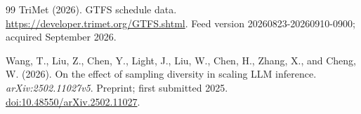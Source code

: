 \documentclass[a4paper,twoside]{article}
\begin{document}
\begin{thebibliography}{99}
TriMet (2026). GTFS schedule data.
\url{https://developer.trimet.org/GTFS.shtml}. Feed version 20260823-20260910-0900; acquired September 2026.

Wang, T., Liu, Z., Chen, Y., Light, J., Liu, W., Chen, H., Zhang, X., and Cheng, W. (2026).
On the effect of sampling diversity in scaling LLM inference.
\emph{arXiv:2502.11027v5}. Preprint; first submitted 2025.
\href{https://arxiv.org/abs/2502.11027v5}{doi:10.48550/arXiv.2502.11027}.
\end{thebibliography}
\end{document}

